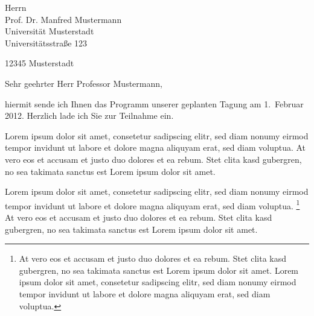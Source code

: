 \documentclass[foldmarks,rightdate,twoside,a4paper]{hhuletter}
\begin{document}
\fontsize{11}{13pt}\selectfont

\begin{letter}{Herrn\\
Prof. Dr. Manfred Mustermann\\
Universität Musterstadt\\
Universitätsstraße 123

12345 Musterstadt}








\signature{}


\subject{Einladung zur Mustertagung}



\opening{Sehr geehrter Herr Professor Mustermann,}

\raggedright %

hiermit sende ich Ihnen das Programm unserer geplanten Tagung am 1.~Februar 2012.
Herzlich lade ich Sie zur Teilnahme ein.

Lorem ipsum dolor sit amet, consetetur sadipscing elitr, sed diam nonumy
eirmod tempor invidunt ut labore et dolore magna aliquyam erat, sed diam
voluptua. At vero eos et accusam et justo duo dolores et ea rebum. Stet
clita kasd gubergren, no sea takimata sanctus est Lorem ipsum dolor sit
amet. 

Lorem ipsum dolor sit amet, consetetur sadipscing elitr, sed diam nonumy
eirmod tempor invidunt ut labore et dolore magna aliquyam erat, sed diam
voluptua. \footnote{At vero eos et accusam et justo duo dolores et ea rebum. Stet
clita kasd gubergren, no sea takimata sanctus est Lorem ipsum dolor sit
amet. Lorem ipsum dolor sit amet, consetetur sadipscing elitr, sed diam
nonumy eirmod tempor invidunt ut labore et dolore magna aliquyam erat, sed
diam voluptua.} At vero eos et accusam et justo duo dolores et ea rebum. Stet
clita kasd gubergren, no sea takimata sanctus est Lorem ipsum dolor sit
amet.   


\end{letter}
\end{document}

